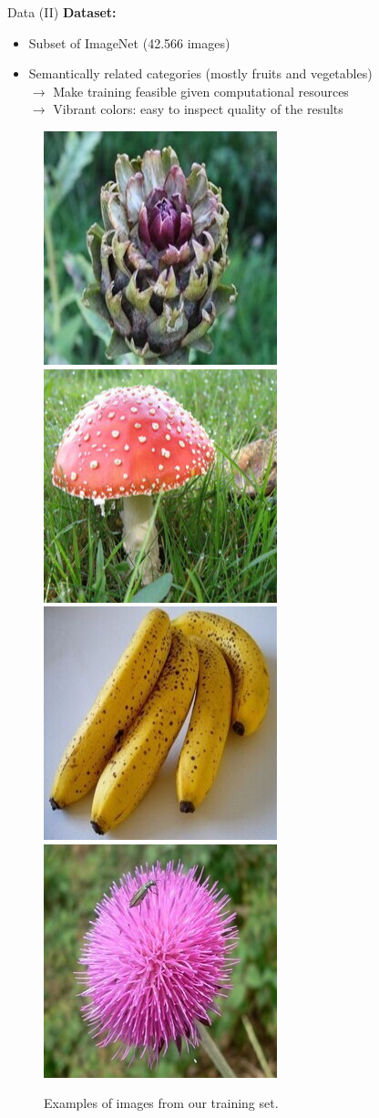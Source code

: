 \documentclass{beamer}
\begin{document}
\begin{frame}{Data (II)}
  \textbf{Dataset:}
    \begin{itemize}
      \item Subset of ImageNet (42.566 images)
      \item Semantically related categories (mostly fruits and vegetables) \\
            $\rightarrow$ Make training feasible given computational resources \\
            $\rightarrow$ Vibrant colors: easy to inspect quality of the results
    \end{itemize}

  \medskip

  \begin{figure}
    \includegraphics[width=.23\linewidth]{resources/veg1.jpg}\hfill
    \includegraphics[width=.23\linewidth]{resources/veg2.jpg}\hfill
    \includegraphics[width=.23\linewidth]{resources/veg3.jpg}\hfill
    \includegraphics[width=.23\linewidth]{resources/veg4.jpg}
    \caption{Examples of images from our training set.}
  \end{figure}
\end{frame}
\end{document}
